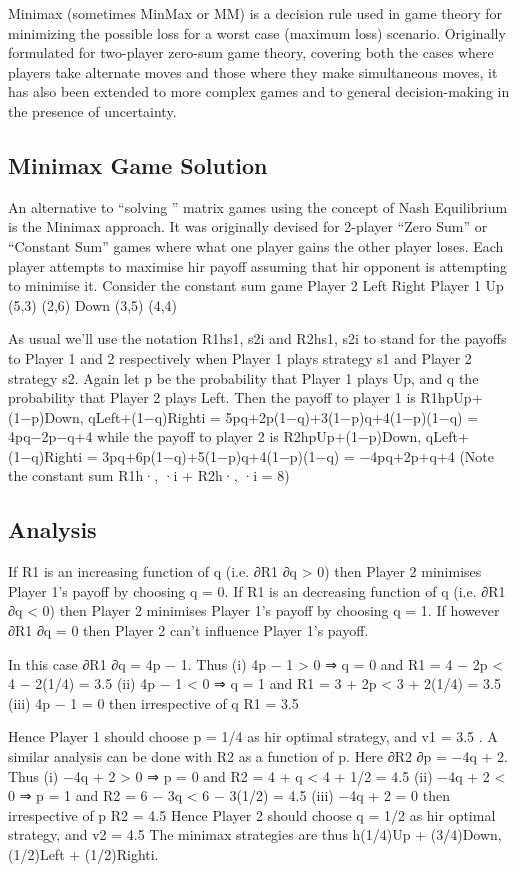 Minimax (sometimes MinMax or MM) is a decision rule used in  game theory for minimizing the possible loss for a worst case (maximum loss) scenario. Originally formulated for two-player zero-sum game theory, covering both the cases where players take alternate moves and those where they make simultaneous moves, it has also been extended to more complex games and to general decision-making in the presence of uncertainty.

\subsection{Minimax Game Solution}
An alternative to “solving ” matrix games using the concept of Nash Equilibrium is the
Minimax approach. It was originally devised for 2-player “Zero Sum” or “Constant Sum”
games where what one player gains the other player loses. Each player attempts to maximise
hir payoff assuming that hir opponent is attempting to minimise it.
Consider the constant sum game
Player 2
Left Right
Player 1 Up (5,3) (2,6)
Down (3,5) (4,4)

As usual we’ll use the notation R1hs1, s2i and R2hs1, s2i to stand for the payoffs to Player
1 and 2 respectively when Player 1 plays strategy s1 and Player 2 strategy s2. Again let p
be the probability that Player 1 plays Up, and q the probability that Player 2 plays Left.
Then the payoff to player 1 is
R1hpUp+(1−p)Down, qLeft+(1−q)Righti = 5pq+2p(1−q)+3(1−p)q+4(1−p)(1−q) = 4pq−2p−q+4
while the payoff to player 2 is
R2hpUp+(1−p)Down, qLeft+(1−q)Righti = 3pq+6p(1−q)+5(1−p)q+4(1−p)(1−q) = −4pq+2p+q+4
(Note the constant sum R1h·, ·i + R2h·, ·i = 8)

\subsection{Analysis}
If R1 is an increasing function of q (i.e. ∂R1
∂q > 0) then Player 2 minimises Player 1’s
payoff by choosing q = 0. If R1 is an decreasing function of q (i.e. ∂R1
∂q < 0) then Player
2 minimises Player 1’s payoff by choosing q = 1. If however ∂R1
∂q = 0 then Player 2 can’t
influence Player 1’s payoff.

In this case ∂R1
∂q = 4p − 1. Thus
(i) 4p − 1 > 0 ⇒ q = 0 and
R1 = 4 − 2p < 4 − 2(1/4) = 3.5
(ii) 4p − 1 < 0 ⇒ q = 1 and
R1 = 3 + 2p < 3 + 2(1/4) = 3.5
(iii) 4p − 1 = 0 then irrespective of q
R1 = 3.5


Hence Player 1 should choose p = 1/4 as hir optimal strategy, and v1 = 3.5 .
A similar analysis can be done with R2 as a function of p. Here ∂R2
∂p = −4q + 2. Thus
(i) −4q + 2 > 0 ⇒ p = 0 and
R2 = 4 + q < 4 + 1/2 = 4.5
(ii) −4q + 2 < 0 ⇒ p = 1 and
R2 = 6 − 3q < 6 − 3(1/2) = 4.5
(iii) −4q + 2 = 0 then irrespective of p
R2 = 4.5
Hence Player 2 should choose q = 1/2 as hir optimal strategy, and v2 = 4.5
The minimax strategies are thus h(1/4)Up + (3/4)Down,(1/2)Left + (1/2)Righti.
